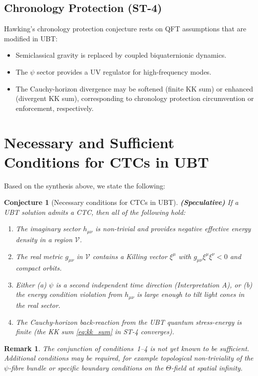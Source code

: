 \documentclass[12pt]{article}
\newtheorem{conjecture}{Conjecture}
\newtheorem{remark}{Remark}
\begin{document}
\subsection{Chronology Protection (ST-4)}
Hawking's chronology protection conjecture rests on QFT assumptions that are
modified in UBT:
\begin{itemize}
  \item Semiclassical gravity is replaced by coupled biquaternionic dynamics.
  \item The $\psi$ sector provides a UV regulator for high-frequency modes.
  \item The Cauchy-horizon divergence may be softened (finite KK sum) or
    enhanced (divergent KK sum), corresponding to chronology protection
    circumvention or enforcement, respectively.
\end{itemize}

\section{Necessary and Sufficient Conditions for CTCs in UBT}
Based on the synthesis above, we state the following:

\begin{conjecture}[Necessary conditions for CTCs in UBT]
\label{conj:necessary}
\textbf{(Speculative)}  If a UBT solution admits a CTC, then all of the
following hold:
\begin{enumerate}
  \item The imaginary sector $h_{\mu\nu}$ is non-trivial and provides
    negative effective energy density in a region $\mathcal{V}$.
  \item The real metric $g_{\mu\nu}$ in $\mathcal{V}$ contains a Killing
    vector $\xi^\mu$ with $g_{\mu\nu}\xi^\mu\xi^\nu < 0$ and compact orbits.
  \item Either (a) $\psi$ is a second independent time direction
    (Interpretation A), or (b) the energy condition violation from
    $h_{\mu\nu}$ is large enough to tilt light cones in the real sector.
  \item The Cauchy-horizon back-reaction from the UBT quantum stress-energy
    is finite (the KK sum \eqref{eq:kk_sum} in ST-4 converges).
\end{enumerate}
\end{conjecture}

\begin{remark}
The conjunction of conditions~1--4 is not yet known to be sufficient.
Additional conditions may be required, for example topological
non-triviality of the $\psi$-fibre bundle or specific boundary conditions
on the $\Theta$-field at spatial infinity.
\end{remark}
\end{document}
